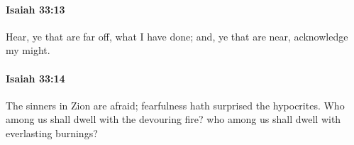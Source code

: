 		\paragraph{Isaiah 33:13} %
			\label{ISAIAH-33-13}

			Hear, ye that are far off, what I have done; and, ye that are near, acknowledge my might.


		\paragraph{Isaiah 33:14} %
			\label{ISAIAH-33-14}

			The sinners in Zion are afraid; fearfulness hath surprised the hypocrites. Who among us shall dwell with the devouring fire? who among us shall dwell with everlasting burnings?



